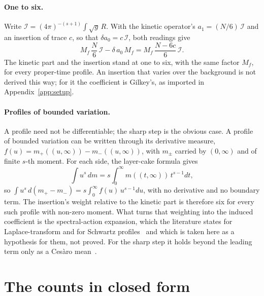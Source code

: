 \documentclass[aps,prd,reprint,amsmath,amssymb,superscriptaddress,nofootinbib]{revtex4-2}
\begin{document}
\paragraph{One to six.}
Write $\mathcal I=(4\pi)^{-(s+1)}\int\!\sqrt g\,R$. With the kinetic operator's
$a_1=(N/6)\,\mathcal I$ and an insertion of trace $c$, so that
$\delta a_0=c\,\mathcal I$, both readings give
\begin{equation}
  M_f\,\frac{N}{6}\,\mathcal I-\delta\,a_0\,M_f=M_f\,\frac{N-6c}{6}\,\mathcal I .
\end{equation}
The kinetic part and the insertion stand at one to six, with the same factor $M_f$, for
every proper-time profile. An insertion that varies over the background is not derived
this way; for it the coefficient is Gilkey's, as imported in Appendix~\ref{app:setup}.

\paragraph{Profiles of bounded variation.}
A profile need not be differentiable; the sharp step is the obvious case. A profile of
bounded variation can be written through its derivative measure,
$f(u)=m_+((u,\infty))-m_-((u,\infty))$, with $m_\pm$ carried by $(0,\infty)$ and of finite
$s$-th moment. For each side, the layer-cake formula gives
\begin{equation}
  \int u^s\,dm=s\int_0^\infty m((t,\infty))\,t^{s-1}dt,
\end{equation}
so $\int u^s\,d(m_+-m_-)=s\int_0^\infty f(u)\,u^{s-1}du$, with no derivative and no boundary
term. The insertion's weight relative to the kinetic part is therefore six for every such
profile with non-zero moment. What turns that weighting into the induced coefficient is the
spectral-action expansion, which the literature states for Laplace-transform and for
Schwartz profiles~\cite{vanSuijlekom2024,EcksteinIochum2018,EstradaGraciaBondiaVarilly1998}
and which is taken here as a hypothesis for them, not proved. For the sharp step it holds
beyond the leading term only as a Ces\`aro mean~\cite{EstradaGraciaBondiaVarilly1998}.

\section{The counts in closed form}
\label{app:counts}
\end{document}
